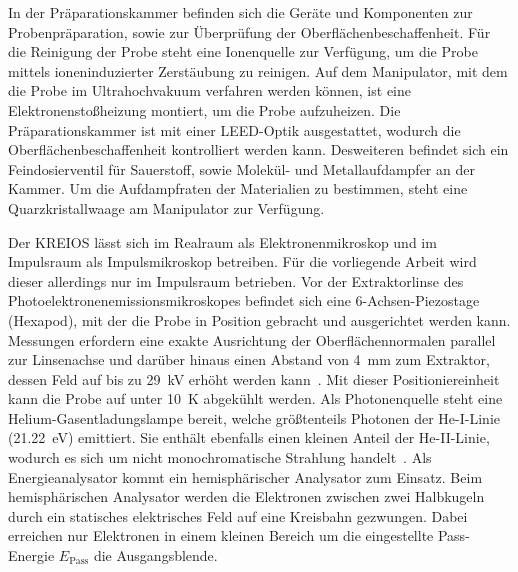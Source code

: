         In der Präparationskammer befinden sich die Geräte und Komponenten zur Probenpräparation, sowie zur Überprüfung der Oberflächenbeschaffenheit.
        Für die Reinigung der Probe steht eine Ionenquelle zur Verfügung, um die Probe mittels ioneninduzierter Zerstäubung zu reinigen.
        Auf dem Manipulator, mit dem die Probe im Ultrahochvakuum verfahren werden können, ist eine Elektronenstoßheizung montiert, um die Probe aufzuheizen.
        Die Präparationskammer ist mit einer LEED-Optik ausgestattet, wodurch die Oberflächenbeschaffenheit kontrolliert werden kann.
        Desweiteren befindet sich ein Feindosierventil für Sauerstoff, sowie Molekül- und Metallaufdampfer an der Kammer.
        Um die Aufdampfraten der Materialien zu bestimmen, steht eine Quarzkristallwaage am Manipulator zur Verfügung.

        Der KREIOS lässt sich im Realraum als Elektronenmikroskop und im Impulsraum als Impulsmikroskop betreiben.
        Für die vorliegende Arbeit wird dieser allerdings nur im Impulsraum betrieben.
        Vor der Extraktorlinse des Photoelektronenemissionsmikroskopes befindet sich eine 6-Achsen-Piezostage (Hexapod), mit der die Probe in Position gebracht und ausgerichtet werden kann.
        Messungen erfordern eine exakte Ausrichtung der Oberflächennormalen parallel zur Linsenachse und darüber hinaus einen Abstand von \SI{4}{\milli\meter} zum Extraktor, dessen Feld auf bis zu \SI{29}{\kilo\volt} erhöht werden kann~\cite{SPECS-MM}.
        Mit dieser Positioniereinheit kann die Probe auf unter \SI{10}{\kelvin} abgekühlt werden.
        Als Photonenquelle steht eine Helium-Gasentladungslampe bereit, welche größtenteils Photonen der He-I-Linie (\SI{21.22}{\electronvolt}) emittiert.
        Sie enthält ebenfalls einen kleinen Anteil der He-II-Linie, wodurch es sich um nicht monochromatische Strahlung handelt~\cite{UVS}.
        Als Energieanalysator kommt ein hemisphärischer Analysator zum Einsatz.
        Beim hemisphärischen Analysator werden die Elektronen zwischen zwei Halbkugeln durch ein statisches elektrisches Feld auf eine Kreisbahn gezwungen.
        Dabei erreichen nur Elektronen in einem kleinen Bereich um die eingestellte Pass-Energie $E_\text{Pass}$ die Ausgangsblende.
